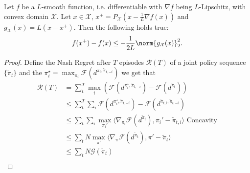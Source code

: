\begin{lemma}\label{lem:descent} 
    Let $f$ be a $L$-smooth function, i.e. differentiable with $\nabla f$ being $L$-Lipschitz, with convex domain $\mathcal{X}$. Let $x\in \mathcal{X}$, $x^{+} = P_{\mathcal{X}} (x - \frac{1}{L} \nabla f(x))$ and $g_{\mathcal{X}}(x) = L(x - x^{+})$. Then the following holds true:
    \begin{equation}
        f(x^{+})-f(x) \leq -\frac{1}{2L}\norm{g_{\mathcal{X}}(x)}_2^2.
    \end{equation}
\end{lemma}


\noregret*
\begin{proof}
    Define the Nash Regret after $T$ episodes $\mathcal R(T)$ of a joint policy sequence $\{\tilde \pi_t \}$ and the $\pi_i^\star = \max_{\pi_i}\mathcal F (d^{\pi_i, \tilde \pi_{t,-i}})$ we get that
    \begin{align*}
        \mathcal R(T) &= \sum_t^T \max_i (\mathcal F (d^{\pi_i^\star, \tilde \pi_{t,-i}}) - \mathcal F(d^{\tilde \pi_{t}}))\\
        &\leq \sum_t^T\sum_i \mathcal F (d^{\pi_i^\star, \tilde \pi_{t,-i}}) - \mathcal F(d^{\tilde \pi_{t,i},\tilde \pi_{t,-i}})\quad  \\
        &\leq  \sum_t \sum_i \max_{\pi_i'}\langle\nabla_{\pi_i}\mathcal F (d^{\tilde \pi_{t}}), \pi_i'  - \tilde \pi_{t,i}\rangle \text{  Concavity}\\%
        &\leq  \sum_t N \max_{\pi'}\langle\nabla_{\pi}\mathcal F (d^{\tilde \pi_{t}}), \pi'  - \tilde \pi_{t}\rangle \\%
        &\leq \sum_t N \mathcal G(\tilde \pi_{t})\\ %

\end{align*}
\end{proof}
